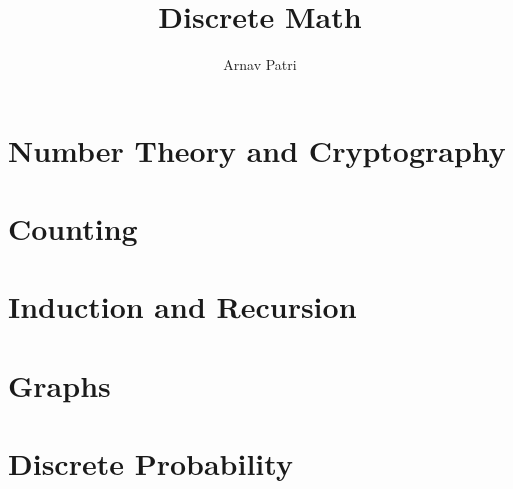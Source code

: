 \documentclass[12pt, A4]{report}
\title{Discrete Math}
\author{Arnav Patri}
\begin{document}
	\maketitle
	\tableofcontents
	\setcounter{chapter}{3}
	\chapter{Number Theory and Cryptography}
		
	\setcounter{chapter}{5}
	\chapter{Counting}
		
	\setcounter{chapter}{4}
	\chapter{Induction and Recursion}
		
	\setcounter{chapter}{9}
	\chapter{Graphs}
		
	\chapter{Discrete Probability}
		
\end{document}
